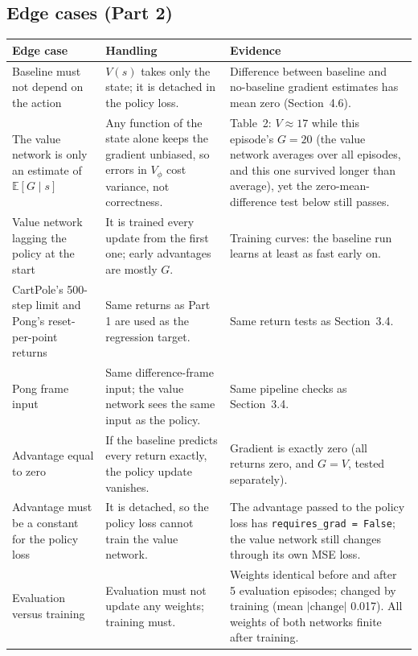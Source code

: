 \documentclass[10pt,a4paper]{article}
\newcommand{\code}[1]{\texttt{#1}}
\newcommand{\hd}[1]{\cellcolor{head}\textbf{#1}}
\begin{document}
\subsection{Edge cases (Part 2)}
\begin{longtable}{@{}p{3.6cm}p{6.5cm}p{6.6cm}@{}}
\hline
\hd{Edge case} & \hd{Handling} & \hd{Evidence} \\
\hline\endhead
Baseline must not depend on the action & $V(s)$ takes only the state; it is detached in the policy loss. & Difference between baseline and no-baseline gradient estimates has mean zero (Section~4.6). \\
The value network is only an estimate of $\mathbb E[G\mid s]$ & Any function of the state alone keeps the gradient unbiased, so errors in $V_\phi$ cost variance, not correctness. & Table~2: $V\approx17$ while this episode's $G=20$ (the value network averages over all episodes, and this one survived longer than average), yet the zero-mean-difference test below still passes. \\
Value network lagging the policy at the start & It is trained every update from the first one; early advantages are mostly $G$. & Training curves: the baseline run learns at least as fast early on. \\
CartPole's 500-step limit and Pong's reset-per-point returns & Same returns as Part 1 are used as the regression target. & Same return tests as Section~3.4. \\
Pong frame input & Same difference-frame input; the value network sees the same input as the policy. & Same pipeline checks as Section~3.4. \\
Advantage equal to zero & If the baseline predicts every return exactly, the policy update vanishes. & Gradient is exactly zero (all returns zero, and $G=V$, tested separately). \\
Advantage must be a constant for the policy loss & It is detached, so the policy loss cannot train the value network. & The advantage passed to the policy loss has \code{requires\_grad = False}; the value network still changes through its own MSE loss. \\
Evaluation versus training & Evaluation must not update any weights; training must. & Weights identical before and after 5 evaluation episodes; changed by training (mean $|\text{change}|$ 0.017). All weights of both networks finite after training. \\
\hline
\end{longtable}
\end{document}
